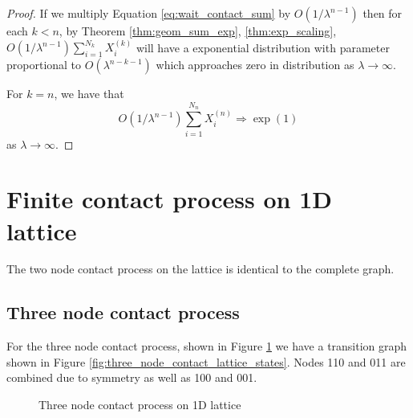\documentclass{article}
\theoremstyle{plain}
\theoremstyle{definition}
\theoremstyle{remark}
\begin{document}
\begin{proof}
If we multiply Equation \eqref{eq:wait_contact_sum} by $O(1/\lambda^{n - 1})$ then for each $k < n$, by Theorem \eqref{thm:geom_sum_exp}, \eqref{thm:exp_scaling}, $O(1/\lambda^{n - 1}) \sum_{i = 
1}^{N_{k}} X_i^{(k)}$ will have a exponential distribution with parameter proportional to $O(\lambda^{n - k - 1})$ which approaches zero in distribution as $\lambda \to \infty$.

For $k = n$, we have that
$$
O(1/\lambda^{n - 1}) \sum_{i = 
1}^{N_{n}} X_i^{(n)} \Rightarrow \exp(1)
$$
as $\lambda \to \infty$.
\end{proof}

\section{Finite contact process on 1D lattice}

The two node contact process on the lattice is identical to the complete graph.

\subsection{Three node contact process}

For the three node contact process, shown in Figure \ref{fig:three_node_contact_lattice} we have a transition graph shown in Figure \ref{fig:three_node_contact_lattice_states}.
Nodes 110 and 011 are combined due to symmetry as well as 100 and 001.


\begin{figure}
    \centering
    \caption{Three node contact process on 1D lattice}
    \label{fig:three_node_contact_lattice}
\end{figure}
\end{document}
